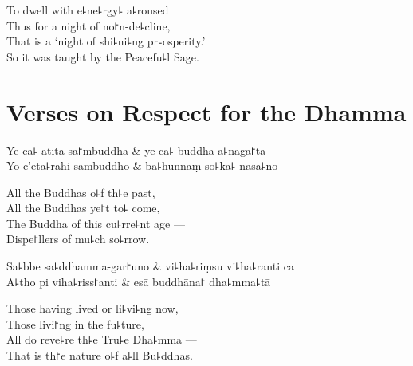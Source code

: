
\begin{english}
  To dwell with e꜕ne꜕rgy꜕ a꜕roused\\
  Thus for a night of no꜓n-de꜕cline,\\
  That is a `night of shi꜕ni꜕ng pr꜕osperity.'\\
  So it was taught by the Peacefu꜕l Sage.
\end{english}

\chapter{Verses on Respect for the Dhamma}%


\begin{leader}
\end{leader}

\begin{twochants}
  Ye ca꜕ atītā sa꜓mbuddhā & ye ca꜕ buddhā a꜕nāga꜓tā \\
  Yo c'eta꜕rahi sambuddho & ba꜕hunnaṃ so꜕ka꜕-nāsa꜕no \\
\end{twochants}

\begin{english}
  All the Buddhas o꜕f th꜕e past,\\
  All the Buddhas ye꜓t to꜕ come,\\
  The Buddha of this cu꜕rre꜕nt age ---\\
  Dispe꜓llers of mu꜕ch so꜕rrow.
\end{english}

\begin{twochants}
  Sa꜕bbe sa꜕ddhamma-gar꜓uno & vi꜕ha꜕riṃsu vi꜕ha꜕ranti ca \\
  A꜕tho pi viha꜕riss꜓anti & esā buddhāna꜓ dha꜕mma꜕tā \\
\end{twochants}

\begin{english}
  Those having lived or li꜕vi꜕ng now,\\
  Those livi꜓ng in the fu꜕ture,\\
  All do reve꜕re th꜕e Tru꜕e Dha꜕mma ---\\
  That is th꜓e nature o꜕f a꜕ll Bu꜕ddhas.
\end{english}

